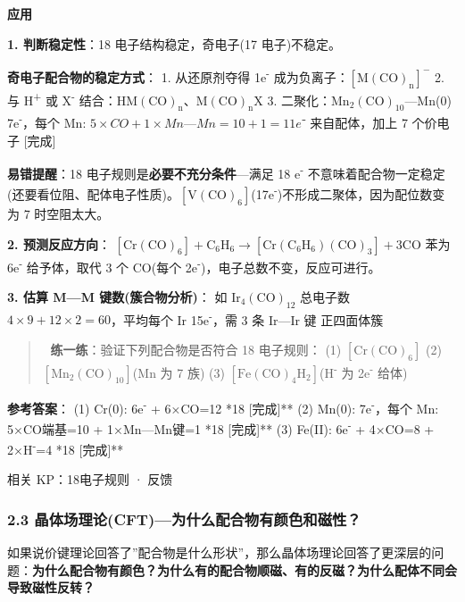 \textbf{应用}

\textbf{1. 判断稳定性}：18 电子结构稳定，奇电子(17 电子)不稳定。

\textbf{奇电子配合物的稳定方式}：
1. 从还原剂夺得 1e\textsuperscript{-} 成为负离子：\([\mathrm{M(CO)_n}]^-\)
2. 与 H\textsuperscript{+} 或 X\textsuperscript{-} 结合：\(\mathrm{HM(CO)_n}\)、\(\mathrm{M(CO)_nX}\)
3. 二聚化：\(\mathrm{Mn_2(CO)_{10}}\)---Mn(0) 7e\textsuperscript{-}，每个 Mn: \(5 \times CO + 1 \times Mn—Mn = 10 + 1 = 11e⁻\) 来自配体，加上 7 个价电子  {[}完成{]}

\textbf{易错提醒}：18 电子规则是\textbf{必要不充分条件}---满足 18 e\textsuperscript{-} 不意味着配合物一定稳定(还要看位阻、配体电子性质)。\([\mathrm{V(CO)_6}]\)(17e\textsuperscript{-})不形成二聚体，因为配位数变为 7 时空阻太大。

\textbf{2. 预测反应方向}：
\([\mathrm{Cr(CO)_6}] + \mathrm{C_6H_6} \rightarrow [\mathrm{Cr(C_6H_6)(CO)_3}] + 3\mathrm{CO}\)
苯为 6e\textsuperscript{-} 给予体，取代 3 个 CO(每个 2e\textsuperscript{-})，电子总数不变，反应可进行。

\textbf{3. 估算 M---M 键数(簇合物分析)}：
如 \(\mathrm{Ir_4(CO)_{12}}\) \箭 总电子数 \(4 \times 9 + 12 \times 2 = 60\)，平均每个 Ir 15e\textsuperscript{-}，需 3 条 Ir---Ir 键 \箭 正四面体簇

\begin{quote}
📝 \textbf{练一练}：验证下列配合物是否符合 18 电子规则：
(1) \(\mathrm{[Cr(CO)_6]}\)
(2) \(\mathrm{[Mn_2(CO)_{10}]}\)(Mn 为 7 族)
(3) \(\mathrm{[Fe(CO)_4H_2]}\)(H\textsuperscript{-} 为 2e\textsuperscript{-} 给体)
\end{quote}

\textbf{参考答案}：
(1) Cr(0): 6e\textsuperscript{-} + 6×CO=12 \箭 **18 {[}完成{]}**
(2) Mn(0): 7e\textsuperscript{-}，每个 Mn: 5×CO端基=10 + 1×Mn---Mn键=1 \箭 **18 {[}完成{]}**
(3) Fe(II): 6e\textsuperscript{-} + 4×CO=8 + 2×H\textsuperscript{-}=4 \箭 **18 {[}完成{]}**

相关 KP：18电子规则 · 反馈

\subsubsection{2.3 晶体场理论(CFT)---为什么配合物有颜色和磁性？}\label{ux6676ux4f53ux573aux7406ux8bbacftux4e3aux4ec0ux4e48ux914dux5408ux7269ux6709ux989cux8272ux548cux78c1ux6027}

如果说价键理论回答了''配合物是什么形状''，那么晶体场理论回答了更深层的问题：\textbf{为什么配合物有颜色？为什么有的配合物顺磁、有的反磁？为什么配体不同会导致磁性反转？}

